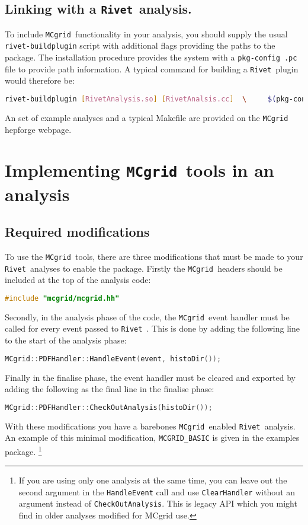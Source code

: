 \documentclass[11pt]{article}
\newcommand{\mcgrid} {{\tt MCgrid }}
\newcommand{\rivet} {{\tt Rivet }}
\begin{document}
\subsection{Linking with a \rivet analysis.}
To include \mcgrid functionality in your analysis, you should supply the usual \lstinline[language=bash]{rivet-buildplugin} script with additional flags providing the paths to the package. The installation procedure provides the system with a \lstinline[language=bash]{pkg-config .pc} file to provide path information. A typical command for building a \rivet plugin would therefore be:
\begin{lstlisting}[language=bash]
 rivet-buildplugin [RivetAnalysis.so] [RivetAnalsis.cc]  \     $(pkg-config mcgrid --cflags) $(pkg-config mcgrid --libs)
\end{lstlisting}
An set of example analyses and a typical Makefile are provided on the \mcgrid hepforge webpage.

\section{Implementing \mcgrid tools in an analysis}
\subsection{Required modifications}
To use the \mcgrid tools, there are three modifications that must be made to your \rivet analyses to enable the package.
Firstly the \mcgrid headers should be included at the top of the analysis code:
\begin{lstlisting}[language=c++]
	#include "mcgrid/mcgrid.hh"
\end{lstlisting}
Secondly, in the analysis phase of the code, the \mcgrid event handler must be called for every event passed to \rivet. This is done by adding the following line to the start of the analysis phase:
\begin{lstlisting}[language=c++]
	MCgrid::PDFHandler::HandleEvent(event, histoDir());
\end{lstlisting}
Finally in the finalise phase, the event handler must be cleared and exported by adding the following as the final line in the finalise phase:
\begin{lstlisting}[language=c++]
	MCgrid::PDFHandler::CheckOutAnalysis(histoDir());
\end{lstlisting}
With these modifications you have a barebones \mcgrid enabled \rivet analysis. An example of this minimal modification, \lstinline[language=bash]{MCGRID_BASIC} is given in the examples package.
\footnote{If you are using only one analysis at the same time, you can leave out the second argument in the {\tt HandleEvent} call and use {\tt ClearHandler} without an argument instead of {\tt CheckOutAnalysis}. This is legacy API which you might find in older analyses modified for MCgrid use.}
\end{document}
